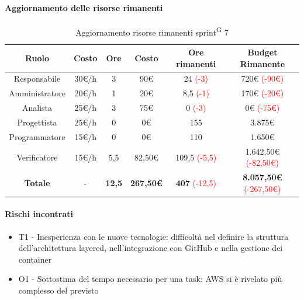 \documentclass[a4paper, 11pt]{article}
\newcommand{\subsubsubsection}[1]{\paragraph{#1}}
\renewcommand{\arraystretch}{1.4} %
\begin{document}
\subsubsubsection{Aggiornamento delle risorse rimanenti}
\begin{table}[H]
	\centering
	\renewcommand{\arraystretch}{1.5}
	
	\begin{tabular}{|c|c|c|c|c|c|}
		\hline
		\textcolor{AccentColor}{\textbf{Ruolo}} &
		\textcolor{AccentColor}{\textbf{Costo}} &
		\textcolor{AccentColor}{\textbf{Ore}} &
		\textcolor{AccentColor}{\textbf{Costo}} &
		\textcolor{AccentColor}{\textbf{Ore rimanenti}} &
		\textcolor{AccentColor}{\textbf{Budget Rimanente}} \\ \hline
		
		Responsabile  & 30€/h & 3    & 90€     & 24 \textcolor{red}{(-3)}      & 720€ \textcolor{red}{(-90€)}    \\ \hline
		Amministratore & 20€/h & 1   & 20€     & 8,5 \textcolor{red}{(-1)}     & 170€ \textcolor{red}{(-20€)}    \\ \hline
		Analista      & 25€/h & 3    & 75€     & 0 \textcolor{red}{(-3)}       & 0€ \textcolor{red}{(-75€)}      \\ \hline
		Progettista   & 25€/h & 0    & 0€      & 155                           & 3.875€                          \\ \hline
		Programmatore & 15€/h & 0    & 0€      & 110                           & 1.650€                          \\ \hline
		Verificatore  & 15€/h & 5,5  & 82,50€  & 109,5 \textcolor{red}{(-5,5)} & 1.642,50€ \textcolor{red}{(-82,50€)} \\ \hline
		\textbf{Totale} & - & \textbf{12,5} & \textbf{267,50€} & \textbf{407} \textcolor{red}{(-12,5)} & \textbf{8.057,50€} \textcolor{red}{(-267,50€)} \\ \hline
	\end{tabular}
	\caption{Aggiornamento risorse rimanenti sprint\textsuperscript{G} 7}
\end{table}

\subsubsubsection{Rischi incontrati}
\begin{itemize}
	\item T1 - Inesperienza con le nuove tecnologie: difficoltà nel definire la struttura dell'architettura layered, nell'integrazione con GitHub e nella gestione dei container
	\item O1 - Sottostima del tempo necessario per una task: AWS si è rivelato più complesso del previsto
\end{itemize}
\end{document}
